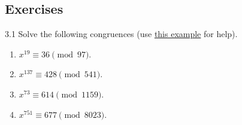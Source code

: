 \renewcommand{\theenumi}{\alph{enumi}}
\renewcommand{\labelenumi}{(\theenumi)}
\subsection{Exercises}

\begin{exercise}
    {3.1} {Solve the following congruences (use \hyperref[ex:3.3]{this example} for help).}
    \begin{enumerate}
        \item \(x^{19} \equiv 36 \pmod{97}\).
        \item \(x^{137} \equiv 428 \pmod{541}\).
        \item \(x^{73} \equiv 614 \pmod{1159}\).
        \item \(x^{751} \equiv 677 \pmod{8023}\).
    \end{enumerate}
\end{exercise}

